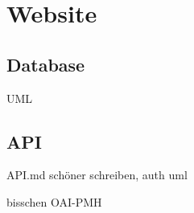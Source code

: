 \chapter{Website}
\section{Database}
UML
\section{API}
API.md schöner schreiben, auth uml

bisschen OAI-PMH


